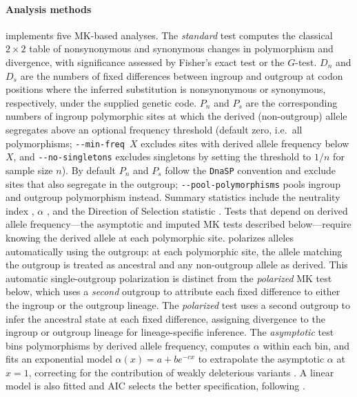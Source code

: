 \paragraph{Analysis methods}
\mkado implements five MK-based analyses.
The \textit{standard} test computes the classical $2 \times 2$ table
of nonsynonymous and synonymous changes
in polymorphism and divergence,
with significance assessed by Fisher's exact test
or the $G$-test.
$D_n$ and $D_s$ are the numbers of fixed differences
between ingroup and outgroup at codon positions where the inferred
substitution is nonsynonymous or synonymous, respectively, under the
supplied genetic code.
$P_n$ and $P_s$ are the corresponding numbers of ingroup
polymorphic sites at which the derived (non-outgroup) allele
segregates above an optional frequency threshold
(default zero, i.e.\ all polymorphisms;
\texttt{-{}-min-freq~$X$} excludes sites with derived allele
frequency below $X$, and \texttt{-{}-no-singletons} excludes
singletons by setting the threshold to $1/n$ for sample size $n$).
By default $P_n$ and $P_s$ follow the \texttt{DnaSP} convention
and exclude sites that also segregate in the outgroup;
\texttt{-{}-pool-polymorphisms} pools ingroup and outgroup
polymorphism instead.
Summary statistics include the neutrality index \citep[NI;][]{rand1996},
$\alpha$ \citep{smith2002},
and the Direction of Selection statistic
\citep[DoS;][]{stoletzki2011}.
Tests that depend on derived allele frequency---the
asymptotic and imputed MK tests described below---require knowing the
derived allele at each polymorphic site. \mkado{} polarizes alleles
automatically using the outgroup: at each polymorphic site, the
allele matching the outgroup is treated as ancestral and any
non-outgroup allele as derived. This automatic single-outgroup
polarization is distinct from the \textit{polarized} MK test below,
which uses a \emph{second} outgroup to attribute each fixed
difference to either the ingroup or the outgroup lineage.
The \textit{polarized} test uses a second outgroup
to infer the ancestral state at each fixed difference,
assigning divergence to the ingroup or outgroup lineage
for lineage-specific inference.
The \textit{asymptotic} test bins polymorphisms
by derived allele frequency,
computes $\alpha$ within each bin,
and fits an exponential model $\alpha(x) = a + b e^{-cx}$
to extrapolate the asymptotic $\alpha$ at $x = 1$,
correcting for the contribution of weakly deleterious variants
\citep{messer2013}.
A linear model is also fitted
and AIC selects the better specification,
following \citet{haller2017}.

